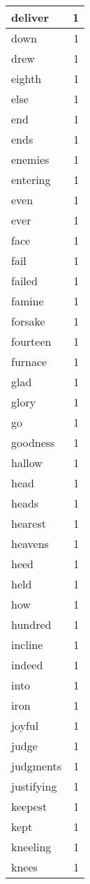 \begin{center}
\begin{longtable}{l|r}
deliver & 1 \\ \hline
down & 1 \\ \hline
drew & 1 \\ \hline
eighth & 1 \\ \hline
else & 1 \\ \hline
end & 1 \\ \hline
ends & 1 \\ \hline
enemies & 1 \\ \hline
entering & 1 \\ \hline
even & 1 \\ \hline
ever & 1 \\ \hline
face & 1 \\ \hline
fail & 1 \\ \hline
failed & 1 \\ \hline
famine & 1 \\ \hline
forsake & 1 \\ \hline
fourteen & 1 \\ \hline
furnace & 1 \\ \hline
glad & 1 \\ \hline
glory & 1 \\ \hline
go & 1 \\ \hline
goodness & 1 \\ \hline
hallow & 1 \\ \hline
head & 1 \\ \hline
heads & 1 \\ \hline
hearest & 1 \\ \hline
heavens & 1 \\ \hline
heed & 1 \\ \hline
held & 1 \\ \hline
how & 1 \\ \hline
hundred & 1 \\ \hline
incline & 1 \\ \hline
indeed & 1 \\ \hline
into & 1 \\ \hline
iron & 1 \\ \hline
joyful & 1 \\ \hline
judge & 1 \\ \hline
judgments & 1 \\ \hline
justifying & 1 \\ \hline
keepest & 1 \\ \hline
kept & 1 \\ \hline
kneeling & 1 \\ \hline
knees & 1 \\ \hline

\end{longtable}
\end{center}
